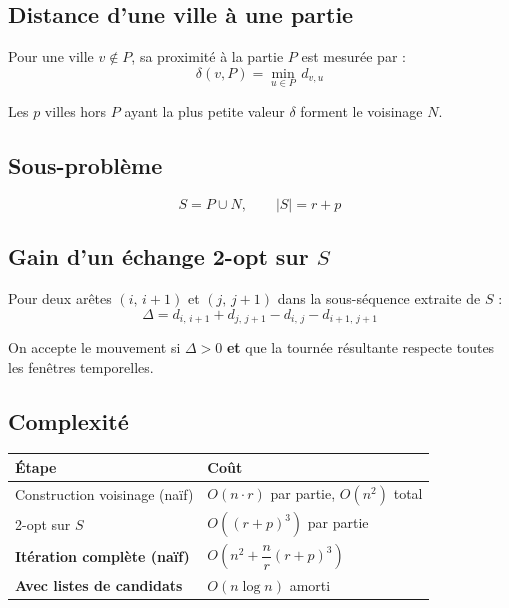\documentclass[11pt,a4paper]{article}
\begin{document}
\subsection{Distance d'une ville à une partie}

Pour une ville $v \notin P$, sa proximité à la partie $P$ est mesurée par :
\begin{equation}
  \delta(v, P) = \min_{u \in P} \, d_{v,u}
\end{equation}

Les $p$ villes hors $P$ ayant la plus petite valeur $\delta$ forment le
voisinage $N$.

\subsection{Sous-problème}

\begin{equation}
  S = P \cup N, \qquad |S| = r + p
\end{equation}

\subsection{Gain d'un échange 2-opt sur $S$}

Pour deux arêtes $(i,\, i{+}1)$ et $(j,\, j{+}1)$ dans la sous-séquence
extraite de $S$ :
\begin{equation}
  \Delta = d_{i,\,i+1} + d_{j,\,j+1} - d_{i,\,j} - d_{i+1,\,j+1}
\end{equation}

On accepte le mouvement si $\Delta > 0$ \textbf{et} que la tournée résultante
respecte toutes les fenêtres temporelles.

\subsection{Complexité}

\begin{center}
\begin{tabular}{ll}
  \toprule
  Étape & Coût \\
  \midrule
  Construction voisinage (naïf) & $O(n \cdot r)$ par partie, $O(n^2)$ total \\
  2-opt sur $S$                  & $O\!\left((r+p)^3\right)$ par partie \\
  \textbf{Itération complète (naïf)} &
    $O\!\left(n^2 + \dfrac{n}{r}(r+p)^3\right)$ \\
  \textbf{Avec listes de candidats}  & $O(n \log n)$ amorti \\
  \bottomrule
\end{tabular}
\end{center}
\end{document}
